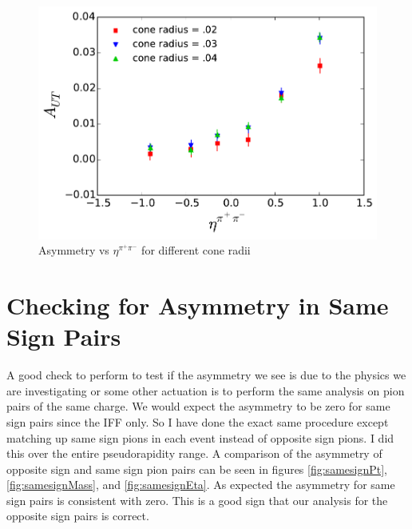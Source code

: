 \documentclass[abstract = on,listof=totoc, bibliography=totoc]{scrreprt}
\newcommand{\etapair}{\eta^{\pi^+\pi^-}}
\begin{document}
\begin{figure}
\begin{center}
\includegraphics[width = .8\textwidth]{allConeAsymsVs_Eta_8_24_15_FullEta}
\caption[Asymmetry vs $\etapair$ for different cone radii]{Asymmetry vs $\etapair$ for different cone radii}
\label{fig:allConesEta}
\end{center}
\end{figure}





\section{Checking for Asymmetry in Same Sign Pairs}
A good check to perform to test if the asymmetry we see is due to the physics we are investigating or some other actuation is to perform the same analysis on pion pairs of the same charge. We would expect the asymmetry to be zero for same sign pairs since the IFF only. So I have done the exact same procedure except matching up same sign pions in each event instead of opposite sign pions. I did this over the entire pseudorapidity range. A comparison of the asymmetry of opposite sign and same sign pion pairs can be seen in figures \ref{fig:samesignPt}, \ref{fig:samesignMass}, and \ref{fig:samesignEta}. As expected the asymmetry for same sign pairs is consistent with zero. This is a good sign that our analysis for the opposite sign pairs is correct. 
\end{document}
